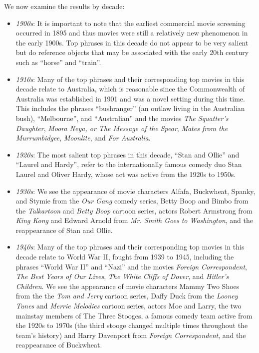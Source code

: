 \documentclass{article}
\begin{document}
\begin{multicols}{2}
We now examine the results by decade:
\begin{itemize}
    \item \textit{1900s}: It is important to note that the earliest commercial movie screening occurred in 1895 and thus movies were still a relatively new phenomenon in the early 1900s. Top phrases in this decade do not appear to be very salient but do reference objects that may be associated with the early 20th century such as ``horse'' and ``train''.
    \item \textit{1910s}: Many of the top phrases and their corresponding top movies in this decade relate to Australia, which is reasonable since the Commonwealth of Australia was established in 1901 and was a novel setting during this time. This includes the phrases ``bushranger'' (an outlaw living in the Australian bush), ``Melbourne'', and ``Australian'' and the movies \textit{The Squatter's Daughter}, \textit{Moora Neya, or The Message of the Spear}, \textit{Mates from the Murrumbidgee}, \textit{Moonlite}, and \textit{For Australia}.
    \item \textit{1920s}: The most salient top phrases in this decade, ``Stan and Ollie'' and ``Laurel and Hardy'', refer to the internationally famous comedy duo Stan Laurel and Oliver Hardy, whose act was active from the 1920s to 1950s.
    \item \textit{1930s}: We see the appearance of movie characters Alfafa, Buckwheat, Spanky, and Stymie from the \textit{Our Gang} comedy series, Betty Boop and Bimbo from the \textit{Talkartoon} and \textit{Betty Boop} cartoon series, actors Robert Armstrong from \textit{King Kong} and Edward Arnold from \textit{Mr. Smith Goes to Washington}, and the reappearance of Stan and Ollie.
    \item \textit{1940s}: Many of the top phrases and their corresponding top movies in this decade relate to World War II, fought from 1939 to 1945, including the phrases ``World War II'' and ``Nazi'' and the movies \textit{Foreign Correspondent}, \textit{The Best Years of Our Lives}, \textit{The White Cliffs of Dover}, and \textit{Hitler's Children}. We see the appearance of movie characters Mammy Two Shoes from the the \textit{Tom and Jerry} cartoon series, Daffy Duck from the \textit{Looney Tunes} and \textit{Merrie Melodies} cartoon series, actors Moe and Larry, the two mainstay members of The Three Stooges, a famous comedy team active from the 1920s to 1970s (the third stooge changed multiple times throughout the team's history) and Harry Davenport from \textit{Foreign Correspondent}, and the reappearance of Buckwheat.

\end{itemize}
\end{multicols}
\end{document}
